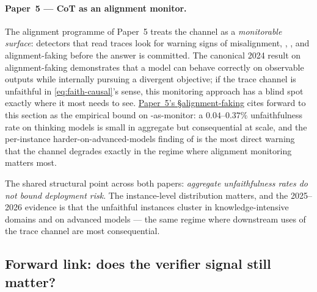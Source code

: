 \paragraph{Paper~5 — CoT as an alignment monitor.}
The alignment programme of Paper~5 treats the  channel as a
\emph{monitorable surface}: detectors that read traces look for
warning signs of misalignment, , , and
alignment-faking before the answer is committed. The
canonical 2024 result on alignment-faking
\citep{greenblatt2024-alignment-faking} demonstrates that a model can
behave correctly on observable outputs while internally pursuing a
divergent objective; if the trace channel is unfaithful in
\cref{eq:faith-causal}'s sense, this monitoring approach has a blind
spot exactly where it most needs to see. \hyperref[P5-sec:alignment-faking]{Paper~5's §alignment-faking} cites
forward to this section as the empirical bound on -as-monitor: a
$0.04$--$0.37\%$ unfaithfulness rate on thinking models
\citep[abstract]{arcuschin2025-cot-wild} is small in aggregate but
consequential at scale, and the per-instance harder-on-advanced-models
finding of \citet{shen2025-faithcot-bench} is the most direct warning
that the channel degrades exactly in the regime where alignment
monitoring matters most.

The shared structural point across both papers: \emph{aggregate
unfaithfulness rates do not bound deployment risk}. The instance-level
distribution matters, and the 2025--2026 evidence is that the unfaithful
instances cluster in knowledge-intensive domains and on advanced models
\citep[abstract]{shen2025-faithcot-bench} — the same regime where
downstream uses of the trace channel are most consequential.

\subsection{Forward link: does the verifier signal still matter?}
\label{sec:faith-forward}

